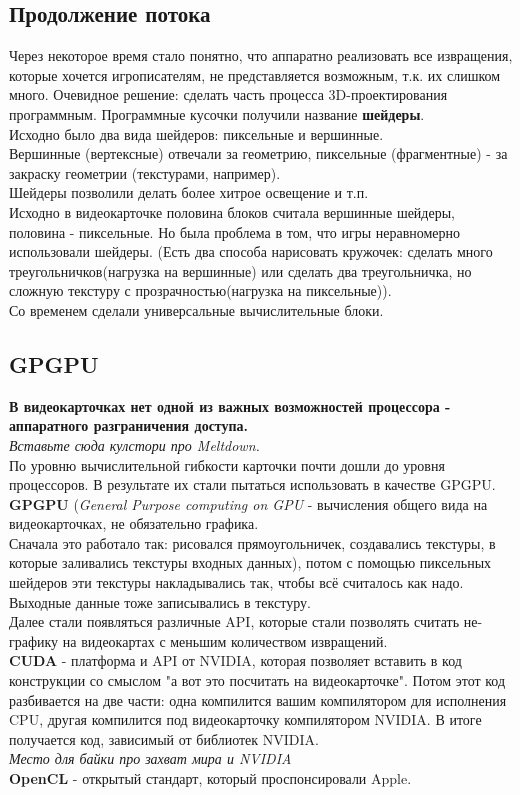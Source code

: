 \documentclass[12pt, a4paper]{article}
\begin{document}
\subsection{Продолжение потока}
Через некоторое время стало понятно, что аппаратно реализовать все извращения, которые хочется игрописателям, не представляется возможным, т.к. их слишком много. Очевидное решение: сделать часть процесса 3D-проектирования программным. Программные кусочки получили название \textbf{шейдеры}.\\
Исходно было два вида шейдеров: пиксельные и вершинные.\\
Вершинные (вертексные) отвечали за геометрию, пиксельные (фрагментные) - за закраску геометрии (текстурами, например).\\
Шейдеры позволили делать более хитрое освещение и т.п.\\
Исходно в видеокарточке половина блоков считала вершинные шейдеры, половина - пиксельные. Но была проблема в том, что игры неравномерно использовали шейдеры. (Есть два способа нарисовать кружочек: сделать много треугольничков(нагрузка на вершинные) или сделать два треугольничка, но сложную текстуру с прозрачностью(нагрузка на пиксельные)).\\
Со временем сделали универсальные вычислительные блоки.
\subsection{GPGPU}
\textbf{В видеокарточках нет одной из важных возможностей процессора - аппаратного разграничения доступа.}\\
\textit{Вставьте сюда кулстори про Meltdown.}\\
По уровню вычислительной гибкости карточки почти дошли до уровня процессоров. В результате их стали пытаться использовать в качестве GPGPU.\\
\textbf{GPGPU} (\textit{General Purpose computing on GPU} - вычисления общего вида на видеокарточках, не обязательно графика.\\
Сначала это работало так: рисовался прямоугольничек, создавались текстуры, в которые заливались текстуры входных данных), потом с помощью пиксельных шейдеров эти текстуры накладывались так, чтобы всё считалось как надо. Выходные данные тоже записывались в текстуру.\\
Далее стали появляться различные API, которые стали позволять считать не-графику на видеокартах с меньшим количеством извращений.\\
\textbf{CUDA} - платформа и API от NVIDIA, которая позволяет вставить в код конструкции со смыслом "а вот это посчитать на видеокарточке". Потом этот код разбивается на две части: одна компилится вашим компилятором для исполнения CPU, другая компилится под видеокарточку компилятором NVIDIA. В итоге получается код, зависимый от библиотек NVIDIA.\\
\textit{Место для байки про захват мира и NVIDIA}\\
\textbf{OpenCL} - открытый стандарт, который проспонсировали Apple.\\
\end{document}
